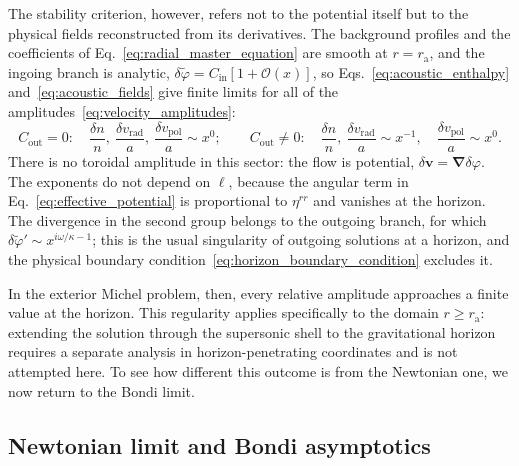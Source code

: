 \documentclass[12pt,a4paper,preprint,nopreprintline]{elsarticle}
\begin{document}
The stability criterion, however, refers not to the potential itself but to the physical fields reconstructed from its derivatives. The background profiles and the coefficients of Eq.~\eqref{eq:radial_master_equation} are smooth at $r=r_{\mathrm{a}}$, and the ingoing branch is analytic, $\delta\widetilde{\varphi}=C_{\mathrm{in}}\left[1+\mathcal{O}(x)\right]$, so Eqs.~\eqref{eq:acoustic_enthalpy} and~\eqref{eq:acoustic_fields} give finite limits for all of the amplitudes~\eqref{eq:velocity_amplitudes}:
\begin{equation}
    C_{\mathrm{out}}=0:
    \quad
    \frac{\delta n}{n},\
    \frac{\delta v_{\mathrm{rad}}}{a},\
    \frac{\delta v_{\mathrm{pol}}}{a}
    \sim x^{0};
    \qquad
    C_{\mathrm{out}}\neq0:
    \quad
    \frac{\delta n}{n},\
    \frac{\delta v_{\mathrm{rad}}}{a}
    \sim x^{-1},
    \quad
    \frac{\delta v_{\mathrm{pol}}}{a}
    \sim x^{0}.
    \label{eq:michel_acoustic_horizon_asymptotics}
\end{equation}
There is no toroidal amplitude in this sector: the flow is potential, $\delta\boldsymbol{v}=\boldsymbol{\nabla}\delta\varphi$. The exponents do not depend on $\ell$, because the angular term in Eq.~\eqref{eq:effective_potential} is proportional to $\eta^{rr}$ and vanishes at the horizon. The divergence in the second group belongs to the outgoing branch, for which $\delta\widetilde{\varphi}'\sim x^{i\omega/\kappa-1}$; this is the usual singularity of outgoing solutions at a horizon, and the physical boundary condition~\eqref{eq:horizon_boundary_condition} excludes it.

In the exterior Michel problem, then, every relative amplitude approaches a finite value at the horizon. This regularity applies specifically to the domain $r\geq r_{\mathrm{a}}$: extending the solution through the supersonic shell to the gravitational horizon requires a separate analysis in horizon-penetrating coordinates and is not attempted here. To see how different this outcome is from the Newtonian one, we now return to the Bondi limit.

\subsection{Newtonian limit and Bondi asymptotics}
\label{sec:newtonian_bondi_acoustic}
\end{document}
